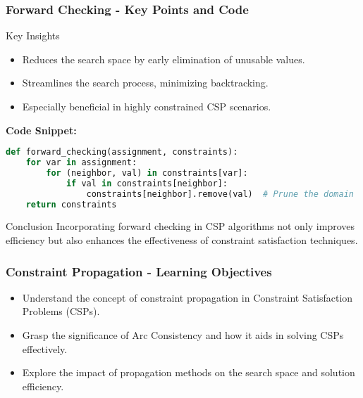 \documentclass[aspectratio=169]{beamer}
\begin{document}
\begin{frame}[fragile]
    \frametitle{Forward Checking - Key Points and Code}
    
    \begin{block}{Key Insights}
        \begin{itemize}
            \item Reduces the search space by early elimination of unusable values.
            \item Streamlines the search process, minimizing backtracking.
            \item Especially beneficial in highly constrained CSP scenarios.
        \end{itemize}
    \end{block}

    \vspace{0.5cm}
    
    \textbf{Code Snippet:}
    \begin{lstlisting}[language=Python]
def forward_checking(assignment, constraints):
    for var in assignment:
        for (neighbor, val) in constraints[var]:
            if val in constraints[neighbor]:
                constraints[neighbor].remove(val)  # Prune the domain
    return constraints
    \end{lstlisting}

    \begin{block}{Conclusion}
        Incorporating forward checking in CSP algorithms not only improves efficiency but also enhances the effectiveness of constraint satisfaction techniques.
    \end{block}
\end{frame}

\begin{frame}[fragile]
    \frametitle{Constraint Propagation - Learning Objectives}
    \begin{itemize}
        \item Understand the concept of constraint propagation in Constraint Satisfaction Problems (CSPs).
        \item Grasp the significance of Arc Consistency and how it aids in solving CSPs effectively.
        \item Explore the impact of propagation methods on the search space and solution efficiency.
    \end{itemize}
\end{frame}
\end{document}
